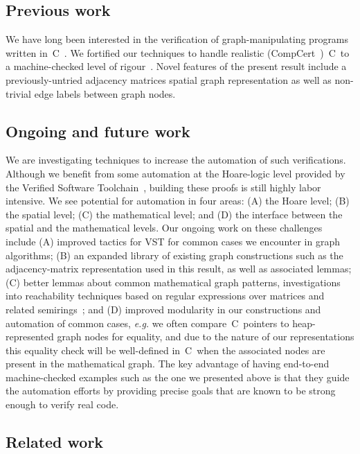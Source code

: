 \subsection{Previous work} We have long been interested in
the verification of graph-manipulating programs written in~C~\cite{hobor:ramification}.
We fortified our techniques to handle realistic (CompCert~\cite{leroy:compcert})~C~to a machine-checked level of rigour~\cite{DBLP:journals/pacmpl/WangCMH19}.  Novel features of the present result include a previously-untried adjacency matrices spatial graph representation as well as non-trivial edge labels between graph nodes. %

\subsection{Ongoing and future work}
{\color{red}We are investigating techniques to increase the automation of such verifications.  Although
we benefit from some automation at the Hoare-logic level provided by the Verified Software
Toolchain~\cite{appel:programlogics}, building these proofs is still highly labor intensive.  We see potential
for automation in four areas: (A) the Hoare level; (B) the spatial level; (C) the mathematical level; and (D) the interface between the spatial and the mathematical levels.  Our ongoing work
on these challenges include (A) improved tactics for VST for common cases we encounter in graph
algorithms; (B) an expanded library of existing graph constructions such as the adjacency-matrix representation used in this result, as well as associated lemmas;
(C) better lemmas about common mathematical graph patterns, investigations into reachability techniques
based on regular expressions over matrices and related semirings~\cite{backhouse,DBLP:journals/jacm/Tarjan81a,dolan2013fun,krishna2017go}; and (D) improved modularity in our constructions and
automation of common cases, \emph{e.g.} we often compare~C~pointers to heap-represented graph
nodes for equality, and due to the nature of our representations this equality check will be
well-defined in~C~when the associated nodes are present in the mathematical graph.  The key
advantage of having end-to-end machine-checked examples such as the one we presented above is
that they guide the automation efforts by providing precise goals that are known to be strong
enough to verify real code.}

\subsection{Related work}

